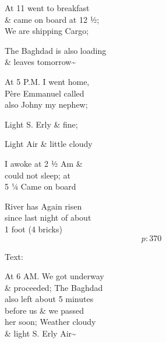 \documentclass{report}
\begin{document}
	\par{
 	At 11 went to breakfast\ \\\& came on board at 12 ½;\ \\We are shipping Cargo;\ \\
	}

	\par{
 	The Baghdad is also loading\ \\\& leaves tomorrow\~{}\ \\
	}

	\par{
 	At 5 P.M. I went home,\ \\Père Emmanuel called\ \\also Johny my nephew;\ \\
	}

	\par{
 	Light S. Erly \& fine;\ \\
	}

	\par{
 	Light Air \& little cloudy\ \\
	}

	\par{
 	I awoke at 2 ½ Am \&\ \\could not sleep; at\ \\5 ¼ Came on board\ \\
	}

	\par{
 	River has Again risen\ \\since last night of about\ \\1 foot (4 bricks)\ \\
  \[p: 370 \]

	}





	\par{
 	Text:\ \\
	}

	\par{
 	At 6 AM. We got underway\ \\\& proceeded; The Baghdad\ \\also left about 5 minutes\ \\before us \& we passed\ \\her soon; Weather cloudy\ \\\& light S. Erly Air\~{}\ \\
	}
\end{document}
